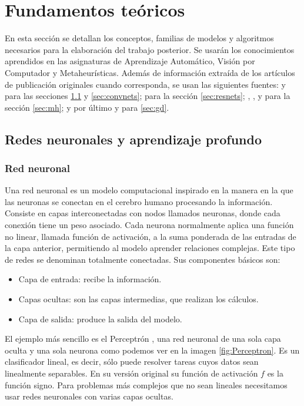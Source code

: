 \section{Fundamentos teóricos}
En esta sección se detallan los conceptos, familias de modelos y algoritmos necesarios para la elaboración del trabajo posterior. Se usarán los conocimientos aprendidos en las asignaturas de Aprendizaje Automático, Visión por Computador y Metaheurísticas. Además de información extraída de los artículos de publicación originales cuando corresponda, se usan las siguientes fuentes: \cite{GoodFellowBook} y \cite{stanford_231} para las secciones \ref{sec:profundo} y \ref{sec:convnets}; \cite{divedeeplearning} para la sección \ref{sec:resnets}; \cite{mhhandbook}, \cite{diffevbook},  \cite{Numerical_optimization} y \cite{stanford_231} para la sección \ref{sec:mh}; y por último \cite{divedeeplearning} y \cite{GoodFellowBook} para \ref{sec:gd}.


\subsection{Redes neuronales y aprendizaje profundo}
\label{sec:profundo}

\subsubsection{Red neuronal}

Una red neuronal es un modelo computacional inspirado en la manera en la que las neuronas se conectan en el cerebro humano procesando la información. Consiste en capas interconectadas con nodos llamados neuronas, donde cada conexión tiene un peso asociado. Cada neurona normalmente aplica una función no linear, llamada función de activación, a la suma ponderada de las entradas de la capa anterior, permitiendo al modelo aprender relaciones complejas. Este tipo de redes se denominan totalmente conectadas. Sus componentes básicos son:

\begin{itemize}
	\item Capa de entrada: recibe la información.
	
	\item Capas ocultas: son las capas intermedias, que realizan los cálculos.
	
	\item Capa de salida: produce la salida del modelo.
\end{itemize}

El ejemplo más sencillo es el Perceptrón \cite{perceptron}, una red neuronal de una sola capa oculta y una sola neurona como podemos ver en la imagen \ref{fig:Perceptron}. Es un clasificador lineal, es decir, sólo puede resolver tareas cuyos datos sean linealmente separables. En su versión original su función de activación $f$ es la función signo. Para problemas más complejos que no sean lineales necesitamos usar redes neuronales con varias capas ocultas.


